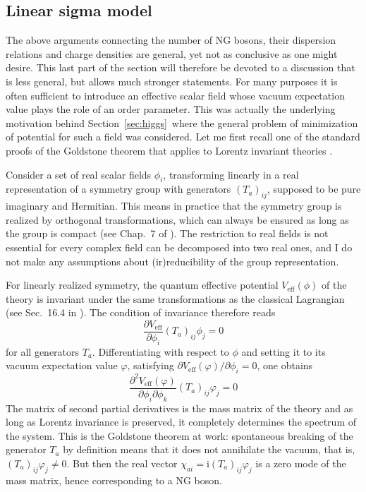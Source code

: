 \documentclass[final,3p,times,12pt,a4paper,sort&compress]{elsarticle}
\newcommand\imag{\mathrm i}                 %
\newcommand\de{\partial}
\newcommand\vp{\varphi}
\newcommand\Pd[2]{\partial #1/\partial #2}  %
\newcommand\PD[2]{\frac{\partial #1}{\partial #2}} %
\begin{document}
\subsection{Linear sigma model}
\label{subsec:lsm}
The above arguments connecting the number of NG bosons, their dispersion
relations and charge densities are general, yet not as conclusive as one might
desire. This last part of the section will therefore be devoted to a discussion
that is less general, but allows much stronger statements. For many purposes it
is often sufficient to introduce an effective scalar field whose vacuum
expectation value plays the role of an order parameter. This was actually the
underlying motivation behind Section~\ref{sec:higgs}\ where the general problem
of minimization of potential for such a field was considered. Let me first
recall one of the standard proofs of the Goldstone theorem that applies to
Lorentz invariant theories \cite{Goldstone:1962es}.

Consider a set of real scalar fields $\phi_i$, transforming linearly in a real
representation of a symmetry group with generators $(T_a)_{ij}$, supposed to be
pure imaginary and Hermitian. This means in practice that the symmetry group is
realized by orthogonal transformations, which can always be ensured as long as
the group is compact (see Chap.~7 of \cite{Barut:1977ba}). The restriction to
real fields is not essential for every complex field can be decomposed into two
real ones, and I do not make any assumptions about (ir)reducibility of the group
representation.

For linearly realized symmetry, the quantum effective potential
$V_{\text{eff}}(\phi)$ of the theory is invariant under the same transformations
as the classical Lagrangian (see Sec.~16.4 in \cite{Weinberg:1996v2}). The
condition of invariance therefore reads
\begin{equation}
\PD{V_{\text{eff}}}{\phi_i}(T_a)_{ij}\phi_j=0
\end{equation}
for all generators $T_a$. Differentiating with respect to $\phi$ and setting it
to its vacuum expectation value $\vp$, satisfying
$\Pd{V_{\text{eff}}(\vp)}{\phi_i}=0$, one obtains
\begin{equation}
\frac{\de^2V_{\text{eff}}(\vp)}{\de\phi_i\de\phi_k}(T_a)_{ij}\vp_j=0
\end{equation}
The matrix of second partial derivatives is the mass matrix of the theory and
as long as Lorentz invariance is preserved, it completely determines the
spectrum of the system. This is the Goldstone theorem at work: spontaneous
breaking of the generator $T_a$ by definition means that it does not annihilate
the vacuum, that is, $(T_a)_{ij}\vp_j\neq0$. But then the real vector
$\chi_{ai}=\imag(T_a)_{ij}\vp_j$ is a zero mode of the mass matrix, hence
corresponding to a NG boson.
\end{document}
